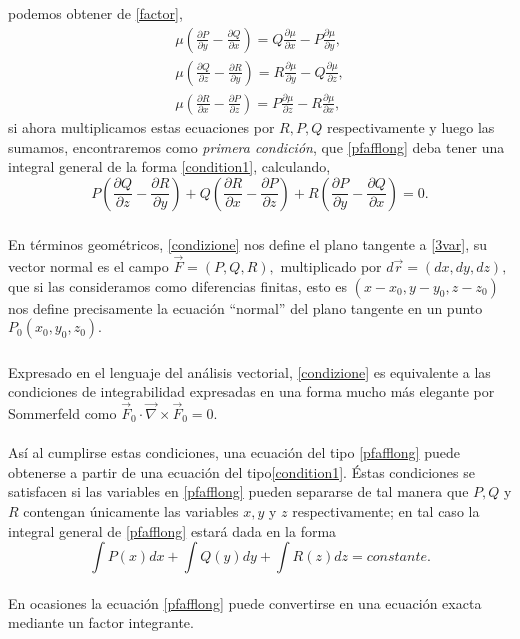 \documentclass{article}
\theoremstyle{definition} \newtheorem{defi}{Definici\'on}
\theoremstyle{definition} \newtheorem{teo}{Teorema}
\theoremstyle{definition} \newtheorem{cor}{Corolario}
\begin{document}
podemos obtener de \eqref{factor}, 
\begin{align}
\mu \left(\frac{\partial{P}}{\partial{y}}-\frac{\partial{Q}}{\partial{x}}\right)=Q\frac{\partial{\mu}}{\partial{x}}-P\frac{\partial{\mu}}{\partial{y}},\nonumber \\
\mu \left(\frac{\partial{Q}}{\partial{z}}-\frac{\partial{R}}{\partial{y}}\right)=R\frac{\partial{\mu}}{\partial{y}}-Q\frac{\partial{\mu}}{\partial{z}},\nonumber \\
\mu \left(\frac{\partial{R}}{\partial{x}}-\frac{\partial{P}}{\partial{z}}\right)=P\frac{\partial{\mu}}{\partial{z}}-R\frac{\partial{\mu}}{\partial{x}},\nonumber
\end{align}
si ahora multiplicamos estas ecuaciones por $R,P,Q$ respectivamente y luego las sumamos, encontraremos como \emph{primera condici\'on}, que \eqref{pfafflong} deba tener una integral general de la forma \eqref{condition1}, calculando,
\begin{equation}\label{condizione}
P\left(\frac{\partial{Q}}{\partial{z}}-\frac{\partial{R}}{\partial{y}}\right)+
Q\left(\frac{\partial{R}}{\partial{x}}-\frac{\partial{P}}{\partial{z}}\right)+
R\left(\frac{\partial{P}}{\partial{y}}-\frac{\partial{Q}}{\partial{x}}\right)=0.
\end{equation}
\subparagraph{}
En t\'erminos geom\'etricos, \eqref{condizione} nos define el plano tangente a \eqref{3var}, su vector normal es el campo $\vec F = (P,Q,R),$ multiplicado por $d\vec r=(dx,dy,dz),$ que si las consideramos como diferencias finitas, esto es $(x-x_0,y-y_0,z-z_0)$ nos define precisamente la ecuaci\'on ``normal'' del plano tangente en un punto $P_0(x_0,y_0,z_0).$
\subparagraph{}
Expresado en el lenguaje del an\'alisis vectorial, \eqref{condizione} es equivalente a las condiciones de integrabilidad expresadas en una forma mucho m\'as elegante por Sommerfeld como $\vec F_0 \cdot \vec \nabla \times \vec F_0 = 0.$
\paragraph{}
As\'i al cumplirse estas condiciones, una ecuaci\'on del tipo \eqref{pfafflong} puede obtenerse a partir de una ecuaci\'on del tipo\eqref{condition1}. \'Estas condiciones se satisfacen si las variables en \eqref{pfafflong} pueden separarse de tal manera que $P,Q$ y $R$ contengan \'unicamente las variables $x,y$ y $z$ respectivamente; en tal caso la integral general de \eqref{pfafflong} estar\'a dada en la forma
$$\int P(x)dx+ \int Q(y)dy+ \int R(z)dz=constante.$$
\paragraph{}
En ocasiones la ecuaci\'on \eqref{pfafflong} puede convertirse en una ecuaci\'on exacta mediante un factor integrante.
\end{document}
